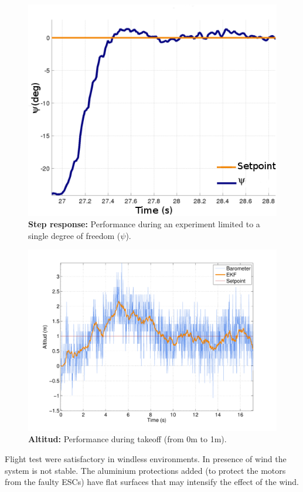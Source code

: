 \documentclass[conference]{IEEEtran}
\begin{document}
\begin{figure}
	\centering
	\includegraphics[width=.9\columnwidth]{./pics_paper/control_escalon_eng.png}
	\caption{\textbf{Step response:} Performance during an experiment limited to a single degree of freedom ($\psi$).}
	\label{fig:psi_esc.pdf}
\end{figure}

\begin{figure}
	\centering
	\includegraphics[width=1\columnwidth]{./pics_paper/altura.pdf}
	\caption{\textbf{Altitud:} Performance during takeoff (from 0m to 1m).}
	\label{fig:altura.pdf}
\end{figure}

Flight test were satisfactory in windless environments. In presence of wind the system is not stable. The aluminium protections added (to protect the motors from the faulty ESCs) have flat surfaces that may intensify the effect of the wind.
\end{document}
